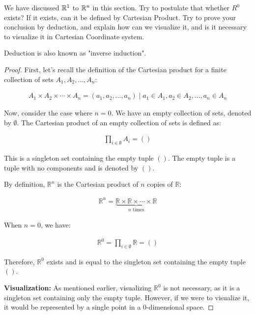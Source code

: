 \begin{exercise}
	We have discussed $\mathbb{R}^1$ to $\mathbb{R}^n$ in this section. Try to postulate that
	whether $R^0$ exists? If it exists, can it be defined by Cartesian Product.
	Try to prove your conclusion by deduction, and explain how can we visualize it, and
	is it necessary to visualize it in Cartesian Coordinate system.
	\begin{remark}
		Deduction is also known as "inverse induction".
	\end{remark}
\end{exercise}
\begin{proof}
	First, let's recall the definition of the Cartesian product for a finite collection of sets $A_1, A_2, \ldots, A_n$:
	
	\begin{align*}
		A_1 \times A_2 \times \cdots \times A_n = {(a_1, a_2, \ldots, a_n) \mid a_1 \in A_1, a_2 \in A_2, \ldots, a_n \in A_n}
	\end{align*}
	
	Now, consider the case where $n = 0$. We have an empty collection of sets, denoted by $\emptyset$. The Cartesian product of an empty collection of sets is defined as:
	
	\begin{align*}
		\prod_{i \in \emptyset} A_i = {()}
	\end{align*}
	
	This is a singleton set containing the empty tuple $()$. The empty tuple is a tuple with no components and is denoted by $()$.
	
	By definition, $\mathbb{R}^n$ is the Cartesian product of $n$ copies of $\mathbb{R}$:
	
	\begin{align*}
		\mathbb{R}^n = \underbrace{\mathbb{R} \times \mathbb{R} \times \cdots \times \mathbb{R}}_{n \text{ times}}
	\end{align*}
	
	When $n = 0$, we have:
	
	\begin{align*}
		\mathbb{R}^0 = \prod_{i \in \emptyset} \mathbb{R} = {()}
	\end{align*}
	
	Therefore, $\mathbb{R}^0$ exists and is equal to the singleton set containing the empty tuple $()$.
	
	\textbf{Visualization:}
	As mentioned earlier, visualizing $\mathbb{R}^0$ is not necessary, as it is a singleton set containing only the empty tuple. However, if we were to visualize it, it would be represented by a single point in a 0-dimensional space.
	

\end{proof}
